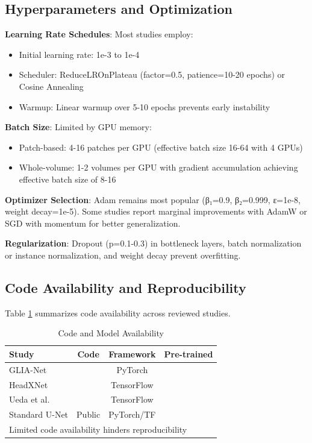 \documentclass[conference]{IEEEtran}
\newcommand{\cmark}{\ding{51}}
\newcommand{\xmark}{\ding{55}}
\begin{document}
\subsection{Hyperparameters and Optimization}

\textbf{Learning Rate Schedules}: Most studies employ:
\begin{itemize}
    \item Initial learning rate: 1e-3 to 1e-4
    \item Scheduler: ReduceLROnPlateau (factor=0.5, patience=10-20 epochs) or Cosine Annealing
    \item Warmup: Linear warmup over 5-10 epochs prevents early instability
\end{itemize}

\textbf{Batch Size}: Limited by GPU memory:
\begin{itemize}
    \item Patch-based: 4-16 patches per GPU (effective batch size 16-64 with 4 GPUs)
    \item Whole-volume: 1-2 volumes per GPU with gradient accumulation achieving effective batch size of 8-16
\end{itemize}

\textbf{Optimizer Selection}: Adam remains most popular (β₁=0.9, β₂=0.999, ε=1e-8, weight decay=1e-5). Some studies report marginal improvements with AdamW or SGD with momentum for better generalization.

\textbf{Regularization}: Dropout (p=0.1-0.3) in bottleneck layers, batch normalization or instance normalization, and weight decay prevent overfitting.

\subsection{Code Availability and Reproducibility}

Table \ref{tab:code} summarizes code availability across reviewed studies.

\begin{table}[htbp]
\caption{Code and Model Availability}
\begin{center}
\scriptsize
\begin{tabular}{|l|c|c|c|}
\hline
\textbf{Study} & \textbf{Code} & \textbf{Framework} & \textbf{Pre-trained} \\
\hline
GLIA-Net & \cmark & PyTorch & \xmark \\
\hline
HeadXNet & \xmark & TensorFlow & \xmark \\
\hline
Ueda et al. & \xmark & TensorFlow & \xmark \\
\hline
Standard U-Net & Public & PyTorch/TF & \cmark \\
\hline
\multicolumn{4}{l}{\footnotesize Limited code availability hinders reproducibility}\\
\end{tabular}
\label{tab:code}
\end{center}
\end{table}
\end{document}
